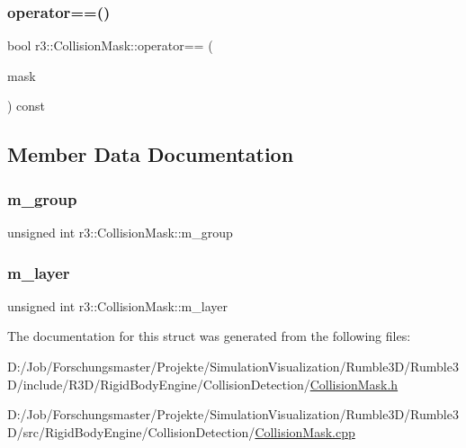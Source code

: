 \mbox{\label{structr3_1_1_collision_mask_a7d1315f7324fc03cee09df2c364f5c54}} 
\subsubsection{\texorpdfstring{operator==()}{operator==()}}
{\footnotesize\ttfamily bool r3\+::\+Collision\+Mask\+::operator== (\begin{DoxyParamCaption}\item[{const \mbox{\hyperlink{structr3_1_1_collision_mask}{Collision\+Mask}} \&}]{mask }\end{DoxyParamCaption}) const}



\subsection{Member Data Documentation}
\mbox{\label{structr3_1_1_collision_mask_a07999f53c748c86623b00e4e07d24d5f}} 
\subsubsection{\texorpdfstring{m\+\_\+group}{m\_group}}
{\footnotesize\ttfamily unsigned int r3\+::\+Collision\+Mask\+::m\+\_\+group}

\mbox{\label{structr3_1_1_collision_mask_a4e3ed2227bb1782f7c6dc948a8427620}} 
\subsubsection{\texorpdfstring{m\+\_\+layer}{m\_layer}}
{\footnotesize\ttfamily unsigned int r3\+::\+Collision\+Mask\+::m\+\_\+layer}



The documentation for this struct was generated from the following files\+:\begin{DoxyCompactItemize}
\item 
D\+:/\+Job/\+Forschungsmaster/\+Projekte/\+Simulation\+Visualization/\+Rumble3\+D/\+Rumble3\+D/include/\+R3\+D/\+Rigid\+Body\+Engine/\+Collision\+Detection/\mbox{\hyperlink{_collision_mask_8h}{Collision\+Mask.\+h}}\item 
D\+:/\+Job/\+Forschungsmaster/\+Projekte/\+Simulation\+Visualization/\+Rumble3\+D/\+Rumble3\+D/src/\+Rigid\+Body\+Engine/\+Collision\+Detection/\mbox{\hyperlink{_collision_mask_8cpp}{Collision\+Mask.\+cpp}}\end{DoxyCompactItemize}
